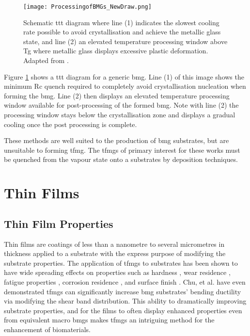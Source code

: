 \documentclass[a4paper,12pt,oneside]{report}%
\begin{document}
\begin{figure}[htb]
	\centering
	\texttt{[image: ProcessingofBMGs\_NewDraw.png]}
	\caption[Schematic \acrshort{ttt} diagram where line (1) indicates the slowest cooling rate possible to avoid crystallisation and achieve the metallic glass state, and line (2) an elevated temperature processing window above \acrshort{Tg} where metallic glass displays excessive plastic deformation.]{Schematic \acrshort{ttt} diagram where line (1) indicates the slowest cooling rate possible to avoid crystallisation and achieve the metallic glass state, and line (2) an elevated temperature processing window above \acrshort{Tg} where metallic glass displays excessive plastic deformation. Adapted from \cite{Schroers2010}.}
	\label{fig:BMGTTT}
\end{figure}

Figure \ref{fig:BMGTTT} shows a \gls{ttt} diagram for a generic \gls{bmg}. Line (1) of this image shows the minimum \gls{Rc} quench required to completely avoid crystallisation nucleation when forming the \gls{bmg}. Line (2) then displays an elevated temperature processing window available for post-processing of the formed \gls{bmg}. Note with line (2) the processing window stays below the crystallisation zone and displays a gradual cooling once the post processing is complete.

These methods are well suited to the production of \gls{bmg} substrates, but are unsuitable to forming \gls{tfmg}. The \glspl{tfmg} of primary interest for these works must be quenched from the vapour state onto a substrates by deposition techniques.

\section{Thin Films}
\subsection{Thin Film Properties}
Thin films are coatings of less than a nanometre to several micrometres in thickness applied to a substrate with the express purpose of modifying the substrate properties. The application of \glspl{tfmg} to substrates has been shown to have wide spreading effects on properties such as hardness \cite{Chu2012},  wear residence \cite{Liu2009, Prakash2005}, fatigue properties \cite{Chiang2006, Chu2011}, corrosion residence \cite{Chu2009}, and surface finish \cite{Liu2009, Chiang2006, Chu2011, Tsai2012}. Chu, et al. \cite{Chu2012} have even demonstrated \glspl{tfmg} can significantly increase \gls{bmg} substrates' bending ductility via modifying the shear band distribution. This ability to dramatically improving substrate properties, and for the films to often display enhanced properties even from equivalent macro \glspl{bmg} makes \glspl{tfmg} an intriguing method for the enhancement of biomaterials.
\end{document}
